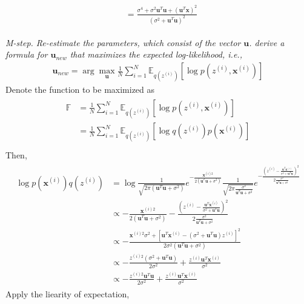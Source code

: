 \documentclass{myhw}
\begin{document}
\begin{homeworkProblem}
\begin{homeworkSection}
\begin{gather*}
\begin{aligned}
&= \frac{\sigma^4+\sigma^2\bm{u}^T\bm{u}+(\bm{u}^T\bm{x})^2}{(\sigma^2+\bm{u}^T\bm{u})^2}
\end{aligned}
\end{gather*}
\end{homeworkSection}
\begin{homeworkSection}	
\emph{M-step. Re-estimate the parameters, which consist of the vector $\bm{u}$. derive a formula for $\bm{u}_{new}$ that maximizes the expected log-likelihood, i.e.,} 
\begin{gather*}
\bm{u}_{new} = \arg\max_{\bm{u}} \frac{1}{N} \sum_{i=1}^N \mathbb{E}_{q(z^{(i)})} 
[\log p(z^{(i)}, \bm{x}^{(i)})]
\end{gather*}
Denote the function to be maximized as 
\begin{gather*}
\begin{aligned}
\mathbb{F} &= \frac{1}{N} \sum_{i=1}^N \mathbb{E}_{q(z^{(i)})} 
[\log p(z^{(i)}, \bm{x}^{(i)})] \\
&= \frac{1}{N} \sum_{i=1}^N \mathbb{E}_{q(z^{(i)})} 
[\log q(z^{(i)})p(\bm{x}^{(i)})] \\
\end{aligned}
\end{gather*}
Then, 
\begin{gather*}
\begin{aligned}
\log p(\bm{x}^{(i)})q(z^{(i)}) &= \log 
\frac{1}{\sqrt{2\pi (\bm{u}^T\bm{u}+\sigma^2)}} e^{-\frac{\bm{x}^{(i)2}}{2(\bm{u}^T\bm{u}+\sigma^2)}}
\frac{1}{\sqrt{2\pi \frac{\sigma^2}{\bm{u}^T\bm{u}+\sigma^2}}} e^{-\frac{(z^{(i)} - \frac{\bm{u}^T\bm{x}^{(i)}}{\sigma^2+\bm{u}^T\bm{u}})^2}{2 \frac{\sigma^2}{\bm{u}^T\bm{u}+\sigma^2} }} \\
&\propto -\frac{\bm{x}^{(i)2}}{2(\bm{u}^T\bm{u}+\sigma^2)} -\frac{(z^{(i)} - \frac{\bm{u}^T\bm{x}^{(i)}}{\sigma^2+\bm{u}^T\bm{u}})^2}{2 \frac{\sigma^2}{\bm{u}^T\bm{u}+\sigma^2} } \\
&\propto -\frac{\bm{x}^{(i)2} \sigma^2 + [\bm{u}^T\bm{x}^{(i)}-(\sigma^2+\bm{u}^T\bm{u})z^{(i)}]^2}{2\sigma^2 (\bm{u}^T\bm{u}+\sigma^2)} \\
&\propto -\frac{z^{(i)2}(\sigma^2+\bm{u}^T\bm{u})}{2\sigma^2} 
+ \frac{z^{(i)}\bm{u}^T\bm{x}^{(i)}}{\sigma^2} \\
&\propto -\frac{z^{(i)2} \bm{u}^T\bm{u} }{2\sigma^2} 
+ \frac{z^{(i)}\bm{u}^T\bm{x}^{(i)}}{\sigma^2}
\end{aligned}
\end{gather*}
Apply the liearity of expectation, 

\end{homeworkSection}
\end{homeworkProblem}
\end{document}
